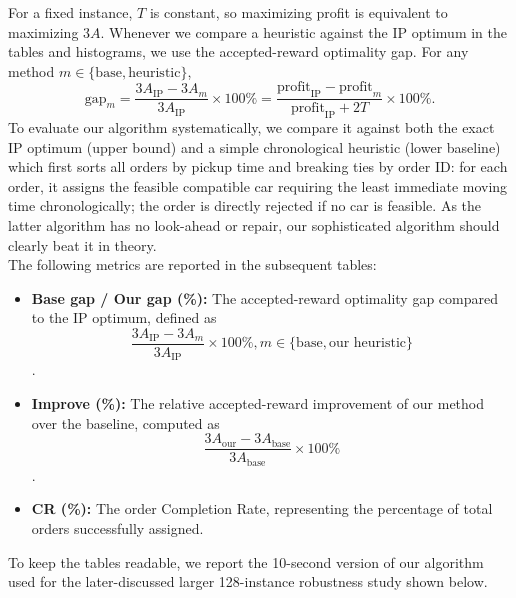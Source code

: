 \documentclass[10pt,a4paper]{article}
\begin{document}
For a fixed instance, $T$ is constant, so maximizing profit is equivalent to
maximizing $3A$.  Whenever we compare a heuristic against the IP optimum in the
tables and histograms, we use the accepted-reward optimality gap.  For any method
$m\in\{\mathrm{base},\mathrm{heuristic}\}$,
\[
\text{gap}_m
=\frac{3A_{\mathrm{IP}}-3A_m}{3A_{\mathrm{IP}}}\times 100\%
=\frac{\text{profit}_{\mathrm{IP}}-\text{profit}_{m}}
{\text{profit}_{\mathrm{IP}}+2T}\times 100\%.
\]
To evaluate our algorithm systematically, we compare it against both the exact IP optimum (upper bound) and a simple chronological heuristic (lower baseline) which first sorts
all orders by pickup time and breaking ties by order ID: for each order, it assigns the feasible compatible car
requiring the least immediate moving time chronologically; the order is directly rejected if no car is feasible. As the latter algorithm has no look-ahead or repair, our sophisticated algorithm should clearly beat it in theory.
\vspace{0.1cm}
\\The following metrics are reported in the subsequent tables:
\vspace{0.1cm}
\begin{itemize}[parsep=0pt, itemsep=-5pt, topsep=-2pt]
    \item \textbf{Base gap / Our gap (\%):} The accepted-reward optimality gap compared to the IP optimum, defined as \[\frac{3A_{\mathrm{IP}} - 3A_m}{3A_{\mathrm{IP}}} \times 100\%, m \in \{\mathrm{base}, \mathrm{\text{our heuristic}}\}\].
    \item \textbf{Improve (\%):} The relative accepted-reward improvement of our method over the baseline, computed as \[\frac{3A_{\mathrm{our}} - 3A_{\mathrm{base}}}{3A_{\mathrm{base}}} \times 100\%\].
    \item \textbf{CR (\%):} The order Completion Rate, representing the percentage of total orders successfully assigned.
\end{itemize}

\vspace{0.2cm}
To keep the tables readable, we report the 10-second version of our algorithm used for the later-discussed larger 128-instance robustness study shown below.
\end{document}
